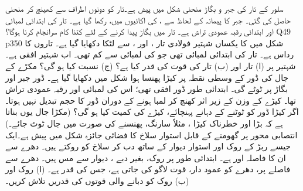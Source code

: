 سلور کے  تار  کی جبر و بگاڑ  منحنی شکل  میں پیش ہے۔تار کو دونوں اطراف سے کھینچ کر منحنی حاصل کی گئی۔ جبر کا پیمانہ  کے لحاظ سے ،  کی اکائیوں میں، رکھا گیا ہے۔ تار کی ابتدائی لمبائی  اور ابتدائی رقبہ عمودی تراش  ہے۔ تار میں     بگاڑ پیدا کرنے کے لئے کتنا کام سرانجام کرنا ہوگا؟
Q49 p350
شکل  میں  کا یکساں شہتیر  فولادی تار ،  اور ، سے لٹکا دکھایا گیا ہے۔ تاروں کا رداس  ہے۔  تار  کی   ابتدائی لمبائی  تھی جو  کی لمبائی سے  کم تھی۔ اب شہتیر افقی ہے۔ شہتیر پر (ا) تار  اور (ب) تار  کی قوت کی قدر کیا ہے؟ (ج)  نسبت  کیا ہو گی؟
مکڑے کے جال کی ڈور کے وسطی نقطہ پر  کیڑا پھنسا ہوا شکل  میں دکھایا گیا ہے۔ ڈور  جبر اور  بگاڑ پر ٹوٹے گی۔ ابتدائی طور ڈور افقی تھی؛ اس کی لمبائی  اور رقبہ
 عمودی تراش  تھا۔ کیڑے کے وزن  کے زیر اثر  کھنچ کر لمبا ہونے کے دوران ڈور کا حجم تبدیل نہیں ہوتا۔ اگر کیڑا ڈور کو ٹوٹنے کے دہانے پہنچائے، کیڑے کی کمیت کیا ہو گی؟ (مکڑا جال یوں بناتا ہے کہ   بڑا اور   خطرناک  کیڑا ، مثلاً  سارنگ، پھنسنے کی صورت میں  جال  ٹوٹ جائے۔)
انتصابی محور پر گھومنے کے قابل استوار سلاخ کا فضائی جائزہ شکل  میں پیش ہے۔ایک جیسے ربڑ کے  روک  اور   استوار دیوار کے ساتھ دب کر سلاخ کو روکتے ہیں۔ دھرے سے ان کا فاصلہ  اور  ہے۔ ابتدائی طور پر روک، بغیر دبے ،  دیوار سے مس ہیں۔ دھرے   سے  فاصلے پر، دھرے کو عمود دار، قوت  لاگو کی جاتی ہے، جس کی قدر  ہے۔ (ا)  روک  اور  (ب) روک  کو دبانے والی قوتوں کی قدریں تلاش کریں۔

